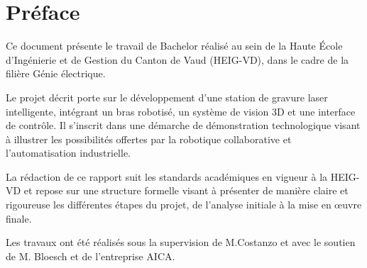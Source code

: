 \chapter*{Préface}

Ce document présente le travail de Bachelor réalisé au sein de la Haute École d'Ingénierie et de Gestion du Canton de Vaud (HEIG-VD), dans le cadre de la filière Génie électrique.

Le projet décrit porte sur le développement d'une station de gravure laser intelligente, intégrant un bras robotisé, un système de vision 3D et une interface de contrôle. Il s'inscrit dans une démarche de démonstration technologique visant à illustrer les possibilités offertes par la robotique collaborative et l'automatisation industrielle.

La rédaction de ce rapport suit les standards académiques en vigueur à la HEIG-VD et repose sur une structure formelle visant à présenter de manière claire et rigoureuse les différentes étapes du projet, de l’analyse initiale à la mise en œuvre finale.

Les travaux ont été réalisés sous la supervision de M.Costanzo et avec le soutien de M. Bloesch et de l'entreprise AICA.

